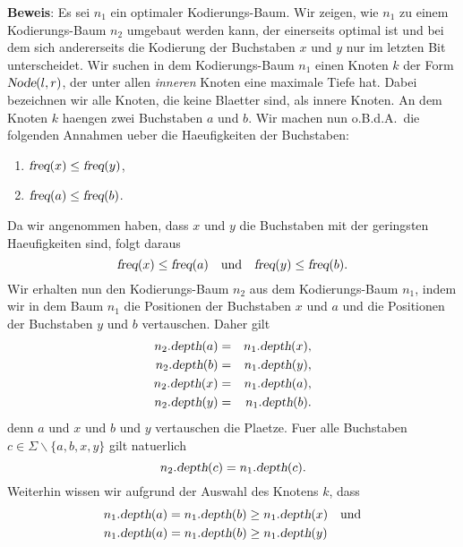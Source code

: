 \noindent
\textbf{Beweis}:  Es sei $n_1$ ein optimaler Kodierungs-Baum.  Wir zeigen, wie $n_1$ zu einem
Kodierungs-Baum $n_2$ umgebaut werden kann, der einerseits optimal ist und bei dem sich andererseits die
Kodierung der Buchstaben $x$ und $y$ nur im letzten Bit unterscheidet.  Wir suchen in dem Kodierungs-Baum
$n_1$ einen Knoten $k$ der Form $\textsl{Node}(l,r)$, der unter allen \emph{inneren} Knoten eine maximale
Tiefe hat.  Dabei bezeichnen wir alle Knoten, die keine Blaetter sind, als innere Knoten.
An dem Knoten $k$ haengen zwei Buchstaben $a$ und $b$.  Wir machen nun o.B.d.A.~die folgenden Annahmen
ueber die Haeufigkeiten der Buchstaben:
\begin{enumerate}
\item $\textsl{freq}(x) \leq \textsl{freq}(y)$,
\item $\textsl{freq}(a) \leq \textsl{freq}(b)$.
\end{enumerate}
Da wir angenommen haben, dass $x$ und $y$ die Buchstaben mit der geringsten Haeufigkeiten sind, folgt
daraus
\begin{equation}
  \label{eq:huffmannL0}
\textsl{freq}(x) \leq \textsl{freq}(a) \quad \textrm{und} \quad 
\textsl{freq}(y) \leq \textsl{freq}(b).  
\end{equation}
Wir erhalten nun den Kodierungs-Baum $n_2$ aus dem Kodierungs-Baum $n_1$, indem wir in dem Baum $n_1$ die
Positionen der Buchstaben $x$ und $a$ und die Positionen der Buchstaben $y$ und $b$ vertauschen.
Daher gilt 
  \begin{eqnarray}
    \label{eq:huffmannL1a}
 n_2.\textsl{depth}(a) &=& n_1.\textsl{depth}(x), \\
    \label{eq:huffmannL1b}
 n_2.\textsl{depth}(b) &=& n_1.\textsl{depth}(y), \\
    \label{eq:huffmannL1c}
 n_2.\textsl{depth}(x) &=& n_1.\textsl{depth}(a), \\
    \label{eq:huffmannL1d}
 n_2.\textsl{depth}(y) &=& n_1.\textsl{depth}(b).
  \end{eqnarray}
denn $a$ und $x$ und $b$ und $y$ vertauschen die Plaetze.  Fuer alle Buchstaben
$c \in \Sigma\backslash\{a,b,x,y\}$ gilt natuerlich 
\begin{equation}
  \label{eq:huffmannL1e}
n_2.\textsl{depth}(c) = n_1.\textsl{depth}(c).   
\end{equation}
Weiterhin wissen wir aufgrund der Auswahl des Knotens $k$, dass
\begin{eqnarray}
  \label{eq:huffmannL2a}
  n_1.\textsl{depth}(a) = n_1.\textsl{depth}(b) \geq n_1.\textsl{depth}(x) \quad \mathrm{und} \\
  \label{eq:huffmannL2b}
  n_1.\textsl{depth}(a) = n_1.\textsl{depth}(b) \geq n_1.\textsl{depth}(y) \hspace*{0.95cm}
\end{eqnarray}
